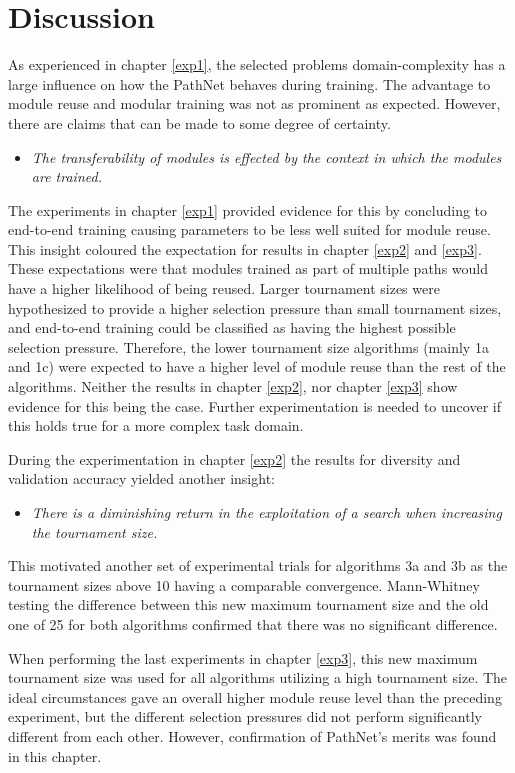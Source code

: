 \section{Discussion}
As experienced in chapter \ref{exp1}, the selected problems domain-complexity has a large influence on how the PathNet behaves during training. The advantage to module reuse and modular training was not as prominent as expected. However, there are claims that can be made to some degree of certainty.

\begin{itemize}
    \item \emph{The transferability of modules is effected by the context in which the modules are trained.}
\end{itemize}
The experiments in chapter \ref{exp1} provided evidence for this by concluding to end-to-end training causing parameters to be less well suited for module reuse. This insight coloured the expectation for results in chapter \ref{exp2} and \ref{exp3}. These expectations were that modules trained as part of multiple paths would have a higher likelihood of being reused. Larger tournament sizes were hypothesized to provide a higher selection pressure than small tournament sizes, and end-to-end training could be classified as having the highest possible selection pressure. Therefore, the lower tournament size algorithms (mainly 1a and 1c) were expected to have a higher level of module reuse than the rest of the algorithms. Neither the results in chapter \ref{exp2}, nor chapter \ref{exp3} show evidence for this being the case. Further experimentation is needed to uncover if this holds true for a more complex task domain. 

During the experimentation in chapter \ref{exp2} the results for diversity and validation accuracy yielded another insight: 
\begin{itemize}
    \item \emph{There is a diminishing return in the exploitation of a search when increasing the tournament size.}
\end{itemize}
This motivated another set of experimental trials for algorithms 3a and 3b as the tournament sizes above 10 having a comparable convergence. Mann-Whitney testing the difference between this new maximum tournament size and the old one of 25 for both algorithms confirmed that there was no significant difference.

When performing the last experiments in chapter \ref{exp3}, this new maximum tournament size was used for all algorithms utilizing a high tournament size. The ideal circumstances gave an overall higher module reuse level than the preceding experiment, but the different selection pressures did not perform significantly different from each other. However, confirmation of PathNet's merits was found in this chapter. 


